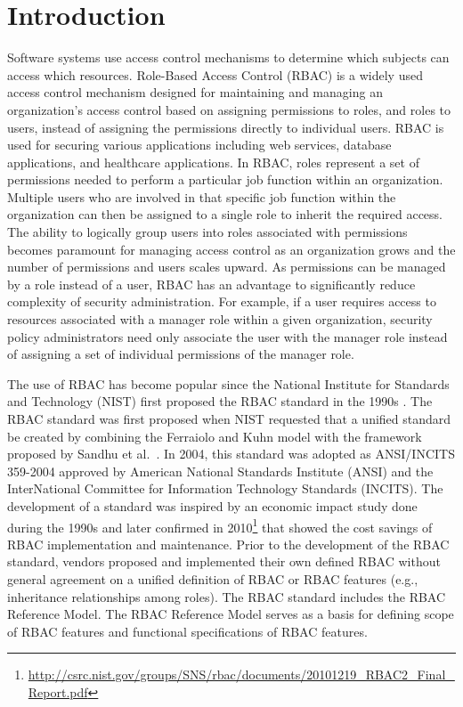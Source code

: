 \section{Introduction} \label{sec:introduction}

Software systems use access control mechanisms to determine which subjects can access
which resources.
Role-Based Access Control (RBAC) is a widely used access control mechanism designed for maintaining and managing an organization's 
access control based on assigning permissions to roles, and roles to users, instead of 
assigning the permissions directly to individual users.
RBAC is used for securing 
various applications including web services, database applications, and healthcare applications. 
In RBAC, roles represent a set of permissions needed to perform a particular job function within an organization.  
Multiple users who are involved in that specific job function within the organization can then be 
assigned to a single role to inherit the required access. 
The ability to logically group users into roles associated with permissions becomes paramount for managing access control as an organization grows
and the number of permissions and users scales upward.
As permissions can be managed by a role instead of a user, RBAC has an advantage to significantly reduce complexity of security
administration.
For example, if a user requires access to resources 
associated with a manager role within a given organization, security policy administrators need only associate the user with the manager role instead
of assigning a set of individual permissions of the manager role.


The use of RBAC has become popular since the National Institute for Standards and Technology (NIST) 
first proposed the RBAC standard in the 1990s \cite{o20102010}.
The RBAC standard was first proposed when NIST 
requested that a unified standard be created by combining the Ferraiolo and Kuhn model \cite{ferraiolokuhn} with the framework 
proposed by Sandhu et al.~\cite{sandhu1996role}.  
In 2004, this standard was adopted as ANSI/INCITS 359-2004 approved by American National Standards Institute (ANSI) and the InterNational Committee for Information Technology Standards (INCITS). 
The development of a standard was inspired by an economic impact study done during the 1990s and later confirmed in 2010\footnote{\url{http://csrc.nist.gov/groups/SNS/rbac/documents/20101219_RBAC2_Final_Report.pdf}} that showed the cost savings of RBAC implementation and maintenance. 
Prior to the development of the RBAC standard, vendors proposed and implemented their own defined RBAC without general agreement on a unified definition of RBAC or RBAC features (e.g., inheritance relationships among roles). The RBAC standard includes the RBAC Reference Model. The RBAC Reference Model serves as a basis for defining scope of RBAC features and functional specifications of RBAC features.

